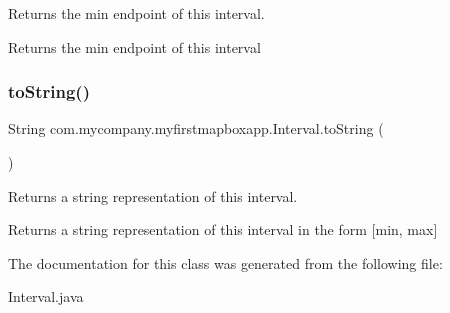 Returns the min endpoint of this interval.

\begin{DoxyReturn}{Returns}
the min endpoint of this interval 
\end{DoxyReturn}
\mbox{\label{classcom_1_1mycompany_1_1myfirstmapboxapp_1_1_interval_a2d2ebc28da1563c7a580aa30b4c20a36}} 
\subsubsection{\texorpdfstring{to\+String()}{toString()}}
{\footnotesize\ttfamily String com.\+mycompany.\+myfirstmapboxapp.\+Interval.\+to\+String (\begin{DoxyParamCaption}{ }\end{DoxyParamCaption})\hspace{0.3cm}{\ttfamily [inline]}}

Returns a string representation of this interval.

\begin{DoxyReturn}{Returns}
a string representation of this interval in the form \mbox{[}min, max\mbox{]} 
\end{DoxyReturn}


The documentation for this class was generated from the following file\+:\begin{DoxyCompactItemize}
\item 
Interval.\+java\end{DoxyCompactItemize}

